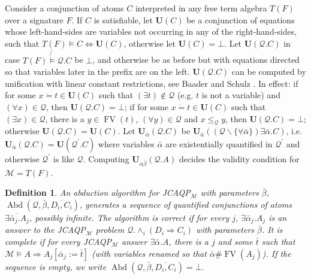 \documentclass{article}
\newcommand{\assign}{:=}
\newcommand{\nin}{\not\in}
\newcommand{\tmem}[1]{{\em #1\/}}
\newcommand{\tmmathbf}[1]{\ensuremath{\boldsymbol{#1}}}
\newcommand{\tmop}[1]{\ensuremath{\operatorname{#1}}}
\newcommand{\tmrsub}[1]{\ensuremath{_{\textrm{#1}}}}
\newtheorem{definition}{Definition}
{\theorembodyfont{\rmfamily}\newtheorem{example}{Example}}
\begin{document}
Consider a conjunction of atoms $C$ interpreted in any free term algebra $T
(F)$ over a signature $F$. If $C$ is satisfiable, let $\tmmathbf{U} (C)$ be a
conjunction of equations whose left-hand-sides are variables not occurring in
any of the right-hand-sides, such that $T (F) \vDash C \Leftrightarrow
\tmmathbf{U} (C)$, otherwise let $\tmmathbf{U} (C) = \bot$. Let $\tmmathbf{U}
(\mathcal{Q}.C)$ in case $T (F) \not{\vDash} \mathcal{Q}.C$ be $\bot$, and
otherwise be as before but with equations directed so that variables later in
the prefix are on the left. $\tmmathbf{U} (\mathcal{Q}.C)$ can be computed by
unification with linear constant restrictions, see Baader and Schulz
{\cite{UnificationBaader}}. In effect: if for some $x \dot{=} t \in
\tmmathbf{U} (C)$ such that $(\exists t) \nin \mathcal{Q}$ (e.g. $t$ is not a
variable) and $(\forall x) \in \mathcal{Q}$, then $\tmmathbf{U}
(\mathcal{Q}.C) = \bot$; if for some $x \dot{=} t \in \tmmathbf{U} (C)$ such
that $(\exists x) \in \mathcal{Q}$, there is a $y \in \tmop{FV} (t)$,
$(\forall y) \in \mathcal{Q}$ and $x \leqslant_{\mathcal{Q}} y$, then
$\tmmathbf{U} (\mathcal{Q}.C) = \bot$; otherwise $\tmmathbf{U} (\mathcal{Q}.C)
=\tmmathbf{U} (C)$. Let $\tmmathbf{U}_{\bar{\alpha}} (\mathcal{Q}.C)$ be
$\tmmathbf{U}_{\bar{\alpha}} ((\mathcal{Q}\backslash \{ \forall \bar{\alpha}
\}) \exists \bar{\alpha} .C)$, i.e. $\tmmathbf{U}_{\bar{\alpha}}
(\mathcal{Q}.C) =\tmmathbf{U} (\mathcal{Q}^{\prime} .C)$ where variables
$\bar{\alpha}$ are existentially quantified in $\mathcal{Q}^{\prime}$ and
otherwise $\mathcal{Q}^{\prime}$ is like $\mathcal{Q}$. Computing
$\tmmathbf{U}_{\bar{\alpha} \bar{\beta}} (\mathcal{Q}.A)$ decides the validity
condition for $\mathcal{M}= T (F)$.

\begin{definition}
  \label{CorComplAbd}An abduction algorithm for JCAQP\tmrsub{$\mathcal{M}$}
  with parameters $\bar{\beta}$, $\tmop{Abd} (\mathcal{Q}, \bar{\beta},
  \overline{D_i, C_i})$, generates a sequence of quantified conjunctions of
  atoms $\overline{\exists \bar{\alpha}_j .A_j}$, possibly infinite. The
  algorithm is {\tmem{correct}} if for every $j$, $\exists \bar{\alpha}_j
  .A_j$ is an answer to the JCAQP\tmrsub{$\mathcal{M}$} problem $\mathcal{Q}.
  \wedge_i (D_i \Rightarrow C_i)$ with parameters $\bar{\beta}$. It is
  {\tmem{complete}} if for every JCAQP\tmrsub{$\mathcal{M}$} answer $\exists
  \bar{\alpha} .A$, there is a $j$ and some $\bar{t}$ such that $\mathcal{M}
  \vDash A \Rightarrow A_j [\bar{\alpha}_j \assign \bar{t}]$ (with variables
  renamed so that $\bar{\alpha} \# \tmop{FV} (A_j)$). If the sequence is
  empty, we write $\tmop{Abd} (\mathcal{Q}, \bar{\beta}, \overline{D_i, C_i})
  = \bot$.
\end{definition}
\end{document}
